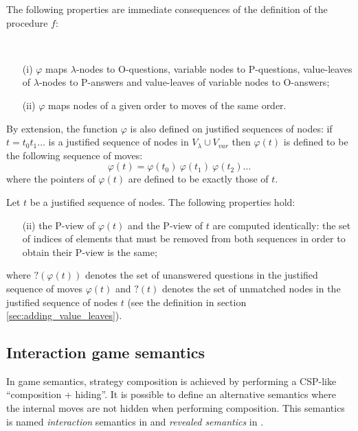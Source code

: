 \documentclass{llncs}
\newcommand\union{\cup}
\begin{document}
The following properties are immediate consequences of the definition of the procedure $f$:
\begin{property} \
\label{proper:phi_conserve_order}
\begin{itemize}
\item[(i)] $\varphi$ maps $\lambda$-nodes to O-questions, variable nodes to
P-questions, value-leaves of $\lambda$-nodes to P-answers and
value-leaves of variable nodes to O-answers;
\item[(ii)] $\varphi$ maps nodes of a given order to moves of the same order.
\end{itemize}
\end{property}
By extension, the function $\varphi$ is also defined on justified
sequences of nodes: if $t = t_0 t_1 \ldots$ is a justified sequence
of nodes in $V_\lambda \union V_{var}$ then $\varphi(t)$ is defined
to be the following sequence of moves:
$$\varphi(t) = \varphi(t_0)\ \varphi(t_1)\  \varphi(t_2) \ldots$$
where the pointers of $\varphi(t)$ are defined to be exactly those
of $t$.

\begin{property}
\label{proper:phi_pview} Let $t$ be a justified sequence of nodes. The following properties hold:
\begin{itemize}
\item[(ii)] the P-view of $\varphi(t)$ and the P-view of $t$ are computed
identically: the set of indices of elements that must be removed
from both sequences in order to obtain their P-view is the same;
\end{itemize}
where $?(\varphi(t))$ denotes the set of unanswered questions in the
justified sequence of moves $\varphi(t)$ and $?(t)$ denotes the set
of unmatched nodes in the justified sequence of nodes $t$ (see the
definition in section \ref{sec:adding_value_leaves}).
\end{property}


\subsection{Interaction game semantics}
\label{sec:interaction_semantics}

In game semantics, strategy composition is achieved by performing a
CSP-like ``composition + hiding''. It is possible to define an
alternative semantics where the internal moves are not hidden when
performing composition. This semantics is named \emph{interaction}
semantics in \cite{DBLP:conf/sas/DimovskiGL05} and \emph{revealed
semantics} in \cite{willgreenlandthesis}.
\end{document}
